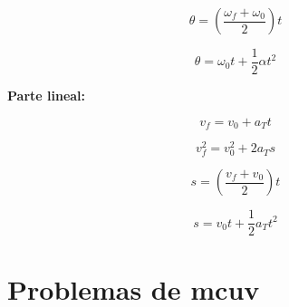 \documentclass[a5paper,pagesize,10pt,bibtotoc,pointlessnumbers,
normalheadings,DIV=9,fleqn,x11names,table,twoside=false]{scrbook}
\begin{document}
\begin{equation}
\theta = (\frac{\omega_f + \omega_0}{2})t
\end{equation}

\begin{equation}
\theta = \omega_0t+\frac{1}{2}\alpha t^2
\end{equation}

\textbf{Parte lineal:}

\begin{equation}
v_f = v_0 + a_Tt
\end{equation}

\begin{equation}
v_f^2 = v_0^2 +2a_Ts
\end{equation}

\begin{equation}
s = (\frac{v_f + v_0}{2})t
\end{equation}

\begin{equation}
s = v_0t+\frac{1}{2}a_Tt^2
\end{equation}


\section{Problemas de mcuv}
\end{document}
